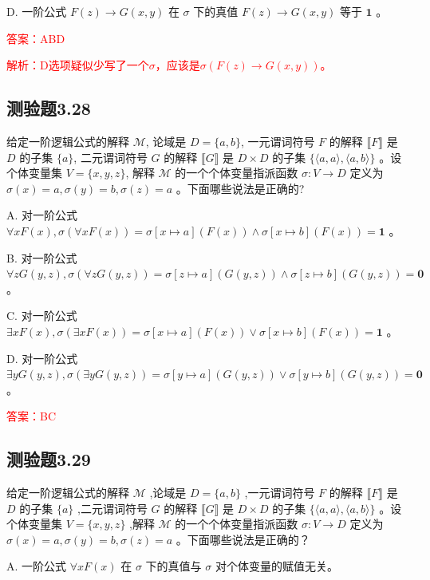 \documentclass[UTF8, heading=true]{ctexart}
\begin{document}
D. 一阶公式 $F(z) \rightarrow G(x, y)$ 在 $\sigma$ 下的真值 $F(z) \rightarrow G(x, y)$ 等于 $\mathbf{1}$ 。


\textcolor{red}{答案：ABD}

\textcolor{red}{解析：D选项疑似少写了一个$\sigma$，应该是$\sigma(F(z) \rightarrow G(x, y))$。}

\subsection{测验题3.28}

给定一阶逻辑公式的解释 $\mathcal{M}$, 
论域是 $D=\{a, b\}$, 一元谓词符号 $F$ 的解释 $\llbracket F \rrbracket$ 
是 $D$ 的子集 $\{a\}$, 二元谓词符号 $G$ 的解释 $\llbracket G \rrbracket$ 是 $D \times D$ 的子集 $\{\langle a, a\rangle,\langle a, b\rangle\}$ 。设个体变量集 $V=\{x, y, z\}$, 解释 $\mathcal{M}$ 的一个个体变量指派函数 $\sigma: V \rightarrow D$ 定义为 $\sigma(x)=a, \sigma(y)=b, \sigma(z)=a$ 。下面哪些说法是正确的?

A. 对一阶公式 $\forall x F(x), \sigma(\forall x F(x))=\sigma[x \mapsto a](F(x)) \wedge \sigma[x \mapsto b](F(x))=\mathbf{1}$ 。

B. 对一阶公式 $\forall z G(y, z), \sigma(\forall z G(y, z))=\sigma[z \mapsto a](G(y, z)) \wedge \sigma[z \mapsto b](G(y, z))=\mathbf{0}$ 。

C. 对一阶公式 $\exists x F(x), \sigma(\exists x F(x))=\sigma[x \mapsto a](F(x)) \vee \sigma[x \mapsto b](F(x))=\mathbf{1}$ 。

D. 对一阶公式 $\exists y G(y, z), \sigma(\exists y G(y, z))=\sigma[y \mapsto a](G(y, z)) \vee \sigma[y \mapsto b](G(y, z))=\mathbf{0}$ 。

\textcolor{red}{答案：BC}

\subsection{测验题3.29}

给定一阶逻辑公式的解释 $\mathcal{M}$ ,论域是 $D=\{a, b\}$ ,一元谓词符号 $F$ 的解释 $\llbracket F \rrbracket$ 是 $D$ 的子集 $\{a\}$ ,二元谓词符号 $G$ 的解释 $\llbracket G \rrbracket$ 是 $D \times D$ 的子集 $\{\langle a, a\rangle,\langle a, b\rangle\}$ 。设个体变量集 $V=\{x, y, z\}$ ,解释 $\mathcal{M}$ 的一个个体变量指派函数 $\sigma: V \rightarrow D$ 定义为 $\sigma(x)=a, \sigma(y)=b, \sigma(z)=a$ 。下面哪些说法是正确的？

A. 
一阶公式 $\forall x F(x)$ 在 $\sigma$ 下的真值与 $\sigma$ 对个体变量的赋值无关。
\end{document}
